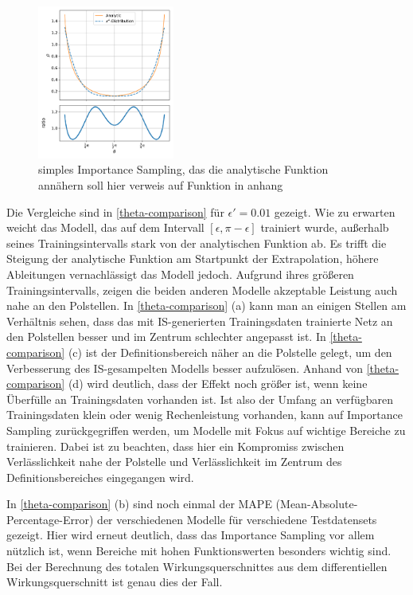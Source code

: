 \begin{figure}
	\centering
	\includegraphics[width=0.4\textwidth]{graphics/4}
	\caption{simples Importance Sampling, das die analytische Funktion annähern soll hier verweis auf Funktion in anhang}
	\label{theta-dist}
\end{figure}
Die Vergleiche sind in \textsf{\autoref{theta-comparison}} für $\epsilon' = 0.01$ gezeigt. Wie zu erwarten weicht das Modell, das auf dem Intervall $[\epsilon, \pi-\epsilon]$ trainiert wurde, außerhalb seines Trainingsintervalls stark von der analytischen Funktion ab. Es trifft die Steigung der analytische Funktion am Startpunkt der Extrapolation, höhere Ableitungen vernachlässigt das Modell jedoch. Aufgrund ihres größeren Trainingsintervalls, zeigen die beiden anderen Modelle akzeptable Leistung auch nahe an den Polstellen. In \textsf{\autoref{theta-comparison} (a)} kann man an einigen Stellen am Verhältnis sehen, dass das mit IS-generierten Trainingsdaten trainierte Netz an den Polstellen besser und im Zentrum schlechter angepasst ist. In \textsf{\autoref{theta-comparison} (c)}  ist der Definitionsbereich näher an die Polstelle gelegt, um den Verbesserung des IS-gesampelten Modells besser aufzulösen. Anhand von \textsf{\autoref{theta-comparison} (d)}  wird deutlich, dass der Effekt noch größer ist, wenn keine Überfülle an Trainingsdaten vorhanden ist. Ist also der Umfang an verfügbaren Trainingsdaten klein oder wenig Rechenleistung vorhanden, kann auf Importance Sampling zurückgegriffen werden, um Modelle mit Fokus auf wichtige Bereiche zu trainieren. Dabei ist zu beachten, dass hier ein Kompromiss zwischen Verlässlichkeit nahe der Polstelle und Verlässlichkeit im Zentrum des Definitionsbereiches eingegangen wird.

In \textsf{\autoref{theta-comparison} (b)} sind noch einmal der MAPE (Mean-Absolute-Percentage-Error) der verschiedenen Modelle für verschiedene Testdatensets gezeigt. Hier wird erneut deutlich, dass das Importance Sampling vor allem nützlich ist, wenn Bereiche mit hohen Funktionswerten besonders wichtig sind. Bei der Berechnung des totalen Wirkungsquerschnittes aus dem differentiellen Wirkungsquerschnitt ist genau dies der Fall.

